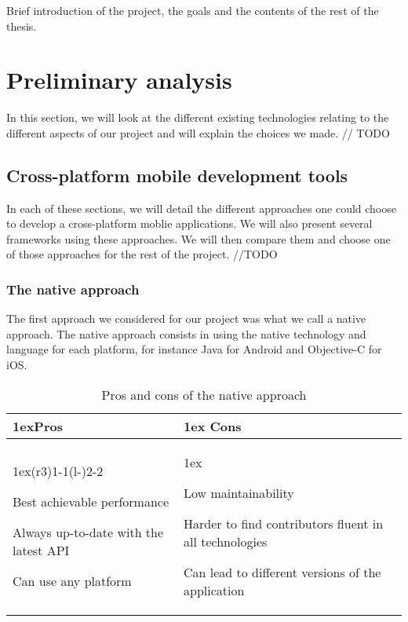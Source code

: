 \documentclass[12pt]{article} %
\begin{document}
Brief introduction of the project, the goals and the contents of the rest of the thesis.


\section{Preliminary analysis}

In this section, we will look at the different existing technologies relating to the different aspects of our project and will explain the choices we made. // TODO

\subsection{Cross-platform mobile development tools}

In each of these sections, we will detail the different approaches one could choose to develop a cross-platform moblie applications. We will also present several frameworks using these approaches. We will then compare them and choose one of those approaches for the rest of the project. //TODO
\subsubsection{The native approach}

The first approach we considered for our project was what we call a native approach. The native approach consists in using the native technology and language for each platform, for instance Java for Android and Objective-C for iOS.  

\begin{table}[H]
\begin{tabularx}{\linewidth}{>{\parskip1ex}X@{\kern4\tabcolsep}>{\parskip1ex}X}
\toprule
\hfil\bfseries Pros
&
\hfil\bfseries Cons
\\\cmidrule(r{3\tabcolsep}){1-1}\cmidrule(l{-\tabcolsep}){2-2}

Best achievable performance\par
Always up-to-date with the latest API\par
Can use any platform\par

&

Low maintainability\par
Harder to find contributors fluent in all technologies\par
Can lead to different versions of the application\par


\\\bottomrule
\end{tabularx}
\caption{Pros and cons of the native approach}
\end{table}
\end{document}

